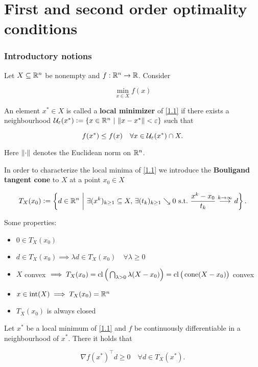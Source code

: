 \part{First and second order optimality conditions}

\section{Introductory notions}

Let \(X \subseteq \mathbb{R}^n\) be nonempty and \(f : \mathbb{R}^n \to \mathbb{R}\). Consider

\begin{equation}\label{1.1}
    \min_{x \in X} f(x)
\end{equation}

An element \(x^* \in X\) is called a \textbf{local minimizer} of \eqref{1.1} if there exists a neighbourhood \(\mathcal{U}_\varepsilon(x^*) \mathrel{\mathop:}= \left\{ x \in \mathbb{R}^n \ \middle| \ \left\| x - x^* \right\| < \varepsilon \right\}\) such that

\begin{equation}\label{1.2}
    f(x^*) \le f(x) \quad \forall x \in \mathcal{U}_\varepsilon(x^*) \cap X.
\end{equation}

Here \(\left\| \cdot \right\|\) denotes the Euclidean norm on \(\mathbb{R}^n\).

In order to characterize the local minima of \eqref{1.1} we introduce the \textbf{Bouligand tangent cone} to \(X\) at a point \(x_0 \in X\)

\[T_X(x_0) \defeq \set{d \in \R^n}{\exists (x^k)_{k \ge 1} \subseteq X ,\, \exists (t_k)_{k \ge 1} \searrow 0 \ \mathrm{s. t.} \ \frac{x^k - x_0}{t_k} \stackrel{k \to \infty}{\longrightarrow} d}.\]

Some properties:

\begin{itemize}
    \item \(0 \in T_X(x_0)\)
    \item \(d \in T_X(x_0) \implies \lambda d \in T_X(x_0) \quad \forall \lambda \ge 0\)
    \item \(X\) convex \(\implies T_X(x_0) = \operatorname{cl}\Big(\bigcap_{\lambda > 0} \lambda (X - x_0)\Big) = \operatorname{cl}\big(\operatorname{cone}(X - x_0)\big)\) convex
    \item \(x \in \operatorname{int}(X) \implies T_X(x_0) = \mathbb{R}^n\)
    \item \(T_X(x_0)\) is always closed
\end{itemize}

\begin{proposition}\label{prop1.1}
    Let \(x^*\) be a local minimum of \eqref{1.1} and \(f\) be continuously differentiable in a neighbourhood of \(x^*\). There it holds that

    \begin{equation}\label{1.3}
        \nabla f(x^*)^\top d \ge 0 \quad \forall d \in T_X(x^*).
    \end{equation}
\end{proposition}
